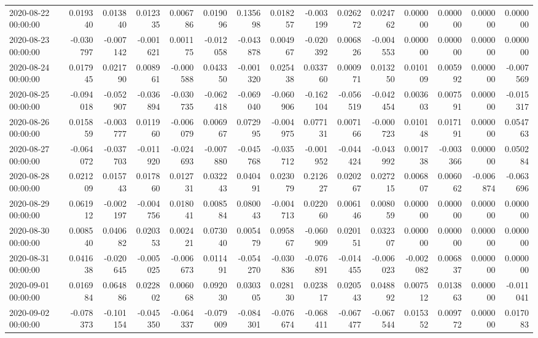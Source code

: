 \begin{tabular}{lrrrrrrrrrrrrrr}
2020-08-22 00:00:00 & 0.019340 & 0.013840 & 0.012335 & 0.006786 & 0.019096 & 0.135698 & 0.018257 & -0.003199 & 0.026272 & 0.024762 & 0.000000 & 0.000000 & 0.000000 & 0.000000 \\
2020-08-23 00:00:00 & -0.030797 & -0.007142 & -0.001621 & 0.001175 & -0.012058 & -0.043878 & 0.004967 & -0.020392 & 0.006826 & -0.004553 & 0.000000 & 0.000000 & 0.000000 & 0.000000 \\
2020-08-24 00:00:00 & 0.017945 & 0.021790 & 0.008961 & -0.000588 & 0.043350 & -0.001320 & 0.025438 & 0.033760 & 0.000971 & 0.013250 & 0.010109 & 0.005992 & 0.000000 & -0.007569 \\
2020-08-25 00:00:00 & -0.094018 & -0.052907 & -0.036894 & -0.030735 & -0.062418 & -0.069040 & -0.060906 & -0.162104 & -0.056519 & -0.042454 & 0.003603 & 0.007591 & 0.000000 & -0.015317 \\
2020-08-26 00:00:00 & 0.015859 & -0.003777 & 0.011960 & -0.006079 & 0.006967 & 0.072995 & -0.004975 & 0.077131 & 0.007166 & -0.000723 & 0.010148 & 0.017191 & 0.000000 & 0.054763 \\
2020-08-27 00:00:00 & -0.064072 & -0.037703 & -0.011920 & -0.024693 & -0.007880 & -0.045768 & -0.035712 & -0.001952 & -0.044424 & -0.043992 & 0.001738 & -0.003366 & 0.000000 & 0.050284 \\
2020-08-28 00:00:00 & 0.021209 & 0.015743 & 0.017860 & 0.012731 & 0.032243 & 0.040491 & 0.023079 & 0.212627 & 0.020267 & 0.027215 & 0.006807 & 0.006062 & -0.006874 & -0.063696 \\
2020-08-29 00:00:00 & 0.061912 & -0.002197 & -0.004756 & 0.018041 & 0.008584 & 0.080043 & -0.004713 & 0.022060 & 0.006146 & 0.008059 & 0.000000 & 0.000000 & 0.000000 & 0.000000 \\
2020-08-30 00:00:00 & 0.008540 & 0.040682 & 0.020353 & 0.002421 & 0.073040 & 0.005479 & 0.095867 & -0.060909 & 0.020151 & 0.032307 & 0.000000 & 0.000000 & 0.000000 & 0.000000 \\
2020-08-31 00:00:00 & 0.041638 & -0.020645 & -0.005025 & -0.006673 & 0.011491 & -0.054270 & -0.030836 & -0.076891 & -0.014455 & -0.006023 & -0.002082 & 0.006837 & 0.000000 & 0.000000 \\
2020-09-01 00:00:00 & 0.016984 & 0.064886 & 0.022802 & 0.006068 & 0.092030 & 0.030305 & 0.028130 & 0.023817 & 0.020543 & 0.048892 & 0.007512 & 0.013863 & 0.000000 & -0.011041 \\
2020-09-02 00:00:00 & -0.078373 & -0.101154 & -0.045350 & -0.064337 & -0.079009 & -0.084301 & -0.076674 & -0.068411 & -0.067477 & -0.067544 & 0.015352 & 0.009772 & 0.000000 & 0.017083 \\

\end{tabular}
